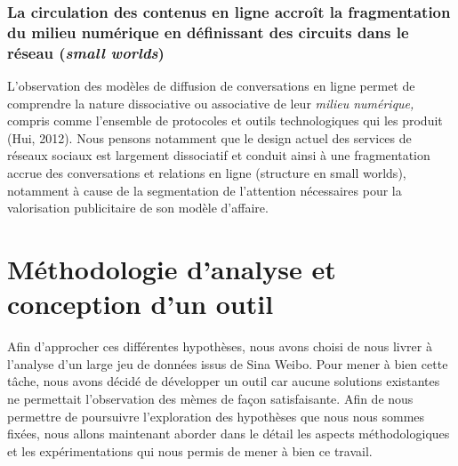 \subsubsection{La circulation des contenus en ligne accroît la fragmentation du milieu numérique en définissant des circuits dans le réseau (\textit{small worlds})}

L{\textquoteright}observation des modèles de diffusion de conversations en ligne permet de comprendre la nature dissociative ou associative de leur \textit{milieu numérique, }compris comme l{\textquoteright}ensemble de protocoles et outils technologiques qui les produit (Hui, 2012). Nous pensons notamment que le design actuel des services de réseaux sociaux est largement dissociatif et conduit ainsi à une fragmentation accrue des conversations et relations en ligne (structure en small worlds), notamment à cause de la segmentation de l{\textquoteright}attention nécessaires pour la valorisation publicitaire de son modèle d{\textquoteright}affaire.  


\section{Méthodologie d'analyse et conception d'un outil} 

Afin d{\textquoteright}approcher ces différentes hypothèses, nous avons choisi de nous livrer à l'analyse d'un large jeu de données issus de Sina Weibo. Pour mener à bien cette tâche, nous avons décidé de développer un outil car aucune solutions existantes ne permettait l'observation des mèmes de façon satisfaisante. Afin de nous permettre de poursuivre l'exploration des hypothèses que nous nous sommes fixées, nous allons maintenant aborder dans le détail les aspects méthodologiques et les expérimentations qui nous permis de mener à bien ce travail.